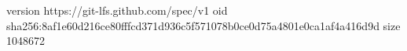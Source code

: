 version https://git-lfs.github.com/spec/v1
oid sha256:8af1e60d216ce80fffcd371d936c5f571078b0ce0d75a4801e0ca1af4a416d9d
size 1048672
